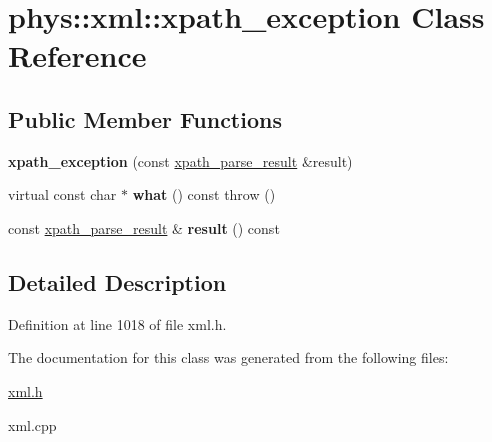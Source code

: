 \hypertarget{classphys_1_1xml_1_1xpath__exception}{
\section{phys::xml::xpath\_\-exception Class Reference}
\label{d1/dcf/classphys_1_1xml_1_1xpath__exception}
}
\subsection*{Public Member Functions}
\begin{DoxyCompactItemize}
\item 
\hypertarget{classphys_1_1xml_1_1xpath__exception_a9a2667d949e2a366f81b8bf8ce6e30a0}{
{\bfseries xpath\_\-exception} (const \hyperlink{structphys_1_1xml_1_1xpath__parse__result}{xpath\_\-parse\_\-result} \&result)}
\label{d1/dcf/classphys_1_1xml_1_1xpath__exception_a9a2667d949e2a366f81b8bf8ce6e30a0}

\item 
\hypertarget{classphys_1_1xml_1_1xpath__exception_ab36b83bb0bacf37aa0d298f724d2a668}{
virtual const char $\ast$ {\bfseries what} () const   throw ()}
\label{d1/dcf/classphys_1_1xml_1_1xpath__exception_ab36b83bb0bacf37aa0d298f724d2a668}

\item 
\hypertarget{classphys_1_1xml_1_1xpath__exception_ac6a47c84f9d434f0eb5d465e5291c490}{
const \hyperlink{structphys_1_1xml_1_1xpath__parse__result}{xpath\_\-parse\_\-result} \& {\bfseries result} () const }
\label{d1/dcf/classphys_1_1xml_1_1xpath__exception_ac6a47c84f9d434f0eb5d465e5291c490}

\end{DoxyCompactItemize}


\subsection{Detailed Description}


Definition at line 1018 of file xml.h.



The documentation for this class was generated from the following files:\begin{DoxyCompactItemize}
\item 
\hyperlink{xml_8h}{xml.h}\item 
xml.cpp\end{DoxyCompactItemize}
